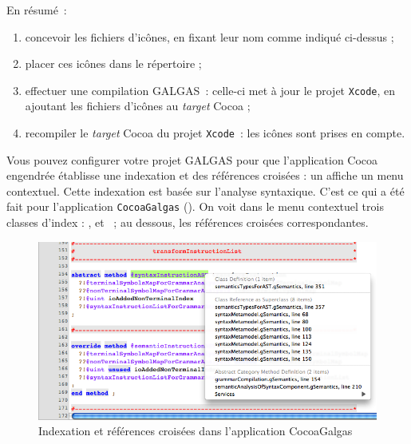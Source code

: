 En résumé~:
\begin{enumerate}
  \item concevoir les fichiers d'icônes, en fixant leur nom comme indiqué ci-dessus ;
  \item placer ces icônes dans le répertoire  ;
  \item effectuer une compilation GALGAS~: celle-ci met à jour le projet \texttt{Xcode}, en ajoutant les fichiers d'icônes au \emph{target} Cocoa ;
  \item recompiler le \emph{target} Cocoa du projet \texttt{Xcode}~: les icônes sont prises en compte.
\end{enumerate}














Vous pouvez configurer votre projet GALGAS pour que l'application Cocoa engendrée établisse une indexation et des références croisées : un  affiche un menu contextuel. Cette indexation est basée sur l'analyse syntaxique. C'est ce qui a été fait pour l'application \texttt{CocoaGalgas} (). On voit dans le menu contextuel trois classes d'index : ,  et ~; au dessous, les références croisées correspondantes.



\begin{figure}[!t]
  \centering
  \includegraphics[width=14cm]{chapitre-cocoa-features/indexing-sample.png}
  \caption{Indexation et références croisées dans l'application CocoaGalgas}
  \ligne
\end{figure}


